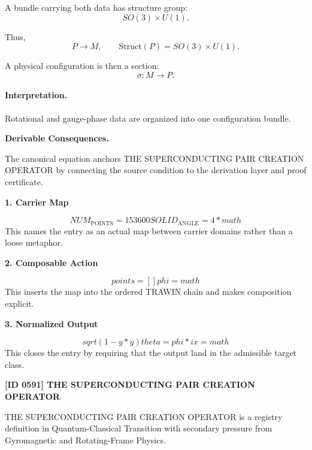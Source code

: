 A bundle carrying both data has structure group:
\begin{equation}
SO(3)\times U(1).
\end{equation}

Thus,
\begin{equation}
P\to M,
\qquad
\mathrm{Struct}(P)=SO(3)\times U(1).
\end{equation}

A physical configuration is then a section:
\begin{equation}
\boxed{
\sigma:M\to P.
}
\end{equation}

\paragraph{Interpretation.}
Rotational and gauge-phase data are organized into one configuration bundle.

\par\vspace{0.35em}
\noindent\textbf{Derivable Consequences.}\quad
\begingroup
\footnotesize
\raggedright
The canonical equation anchors THE SUPERCONDUCTING PAIR CREATION OPERATOR by connecting the source condition to the derivation layer and proof certificate.
\par\endgroup

\noindent\textbf{1. Carrier Map}\par
\[
NUM_{\mathrm{POINTS}} = 153600 SOLID_{\mathrm{ANGLE}} = 4 * math
\]
\noindent This names the entry as an actual map between carrier domains rather than a loose metaphor.\par
\noindent\textbf{2. Composable Action}\par
\[
points = [] phi = math
\]
\noindent This inserts the map into the ordered TRAWIN chain and makes composition explicit.\par
\noindent\textbf{3. Normalized Output}\par
\[
sqrt(1 - y * y) theta = phi * i x = math
\]
\noindent This closes the entry by requiring that the output land in the admissible target class.\par

\clearpage
\noindent\textbf{[ID 0591] THE SUPERCONDUCTING PAIR CREATION OPERATOR}\par
\vspace{0.35em}
\begingroup\small
{}
THE SUPERCONDUCTING PAIR CREATION OPERATOR is a registry definition in Quantum-Classical Transition with secondary pressure from Gyromagnetic and Rotating-Frame Physics.


